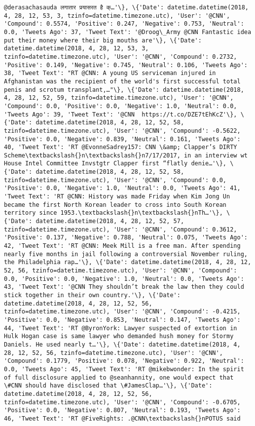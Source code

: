 \documentclass[11pt]{article}
\begin{document}
\begin{Verbatim}[commandchars=\\\{\}]
@derasachasauda लगातार प्रयासरत है क्…'\}, \{'Date': datetime.datetime(2018, 4, 28, 12, 53, 3, tzinfo=datetime.timezone.utc), 'User': '@CNN', 'Compound': 0.5574, 'Positive': 0.247, 'Negative': 0.753, 'Neutral': 0.0, 'Tweets Ago': 37, 'Tweet Text': '@Droog\_Army @CNN Fantastic idea put their money where their big mouths are'\}, \{'Date': datetime.datetime(2018, 4, 28, 12, 53, 3, tzinfo=datetime.timezone.utc), 'User': '@CNN', 'Compound': 0.2732, 'Positive': 0.149, 'Negative': 0.745, 'Neutral': 0.106, 'Tweets Ago': 38, 'Tweet Text': "RT @CNN: A young US serviceman injured in Afghanistan was the recipient of the world's first successful total penis and scrotum transplant,…"\}, \{'Date': datetime.datetime(2018, 4, 28, 12, 52, 59, tzinfo=datetime.timezone.utc), 'User': '@CNN', 'Compound': 0.0, 'Positive': 0.0, 'Negative': 1.0, 'Neutral': 0.0, 'Tweets Ago': 39, 'Tweet Text': '@CNN  https://t.co/DZE7tEhKcZ'\}, \{'Date': datetime.datetime(2018, 4, 28, 12, 52, 58, tzinfo=datetime.timezone.utc), 'User': '@CNN', 'Compound': -0.5622, 'Positive': 0.0, 'Negative': 0.839, 'Neutral': 0.161, 'Tweets Ago': 40, 'Tweet Text': 'RT @EvonneSadrey157: CNN \&amp; Clapper’s DIRTY Scheme\textbackslash{}n\textbackslash{}n7/17/2017, in an interview wt House Intel Committee Invstgtr Clapper first “flatly denie…'\}, \{'Date': datetime.datetime(2018, 4, 28, 12, 52, 58, tzinfo=datetime.timezone.utc), 'User': '@CNN', 'Compound': 0.0, 'Positive': 0.0, 'Negative': 1.0, 'Neutral': 0.0, 'Tweets Ago': 41, 'Tweet Text': 'RT @CNN: History was made Friday when Kim Jong Un became the first North Korean leader to cross into South Korean territory since 1953.\textbackslash{}n\textbackslash{}nTh…'\}, \{'Date': datetime.datetime(2018, 4, 28, 12, 52, 57, tzinfo=datetime.timezone.utc), 'User': '@CNN', 'Compound': 0.3612, 'Positive': 0.137, 'Negative': 0.788, 'Neutral': 0.075, 'Tweets Ago': 42, 'Tweet Text': 'RT @CNN: Meek Mill is a free man. After spending nearly five months in jail following a controversial November ruling, the Philadelphia rap…'\}, \{'Date': datetime.datetime(2018, 4, 28, 12, 52, 56, tzinfo=datetime.timezone.utc), 'User': '@CNN', 'Compound': 0.0, 'Positive': 0.0, 'Negative': 1.0, 'Neutral': 0.0, 'Tweets Ago': 43, 'Tweet Text': '@CNN They shouldn’t break the law then they could stick together in their own country.'\}, \{'Date': datetime.datetime(2018, 4, 28, 12, 52, 56, tzinfo=datetime.timezone.utc), 'User': '@CNN', 'Compound': -0.4215, 'Positive': 0.0, 'Negative': 0.853, 'Neutral': 0.147, 'Tweets Ago': 44, 'Tweet Text': 'RT @ByronYork: Lawyer suspected of extortion in Hulk Hogan case is same lawyer who demanded hush money for Stormy Daniels. He used nearly t…'\}, \{'Date': datetime.datetime(2018, 4, 28, 12, 52, 56, tzinfo=datetime.timezone.utc), 'User': '@CNN', 'Compound': 0.1779, 'Positive': 0.078, 'Negative': 0.922, 'Neutral': 0.0, 'Tweets Ago': 45, 'Tweet Text': 'RT @mikebwonder: In the spirit of full disclosure applied to @seanhannity, one would expect that \#CNN should have disclosed that \#JamesClap…'\}, \{'Date': datetime.datetime(2018, 4, 28, 12, 52, 56, tzinfo=datetime.timezone.utc), 'User': '@CNN', 'Compound': -0.6705, 'Positive': 0.0, 'Negative': 0.807, 'Neutral': 0.193, 'Tweets Ago': 46, 'Tweet Text': 'RT @FiveRights: .@CNN\textbackslash{}nPOTUS said 
\end{Verbatim}
\end{document}
